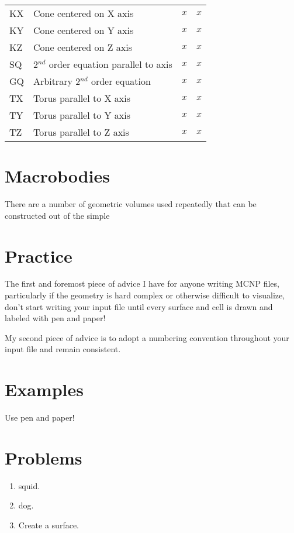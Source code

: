 \documentclass[10pt,a4paper]{book}
\begin{document}
\begin{tabular}{ |l|l|l|l| }
  KX & Cone centered on X axis & $x$ & $x$ \\
  KY & Cone centered on Y axis & $x$ & $x$ \\
  KZ & Cone centered on Z axis & $x$ & $x$ \\ \hline
  SQ & 2$^{nd}$ order equation parallel to axis & $x$ & $x$ \\
  GQ & Arbitrary 2$^{nd}$ order equation & $x$ & $x$ \\ \hline
  TX & Torus parallel to X axis & $x$ & $x$ \\
  TY & Torus parallel to Y axis & $x$ & $x$ \\
  TZ & Torus parallel to Z axis & $x$ & $x$ \\
  \hline
\end{tabular}

\section{Macrobodies}
There are a number of geometric volumes used repeatedly that can be constructed out of the simple 

\section{Practice}

The first and foremost piece of advice I have for anyone writing MCNP files, particularly if the geometry is hard complex or otherwise difficult to visualize, don't start writing your input file until every surface and cell is drawn and labeled with pen and paper!

My second piece of advice is to adopt a numbering convention throughout your input file and remain consistent.

\section{Examples}
Use pen and paper!

\section*{Problems}

\begin{enumerate}
\item squid.

\item dog.

\item Create a surface.

\end{enumerate}
\end{document}

